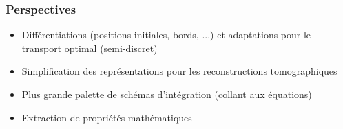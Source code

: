 \documentclass[aspectratio=169]{beamer}
\begin{document}
\begin{frame}
    \frametitle{Perspectives}

    \begin{itemize}
        \item Différentiations (positions initiales, bords, ...) et adaptations pour le transport optimal (semi-discret)
        \vfill
        \item Simplification des représentations pour les reconstructions tomographiques
        \vfill
        \item Plus grande palette de schémas d'intégration (collant aux équations)
        \vfill
        \item Extraction de propriétés mathématiques
    \end{itemize}
\end{frame}
\end{document}

